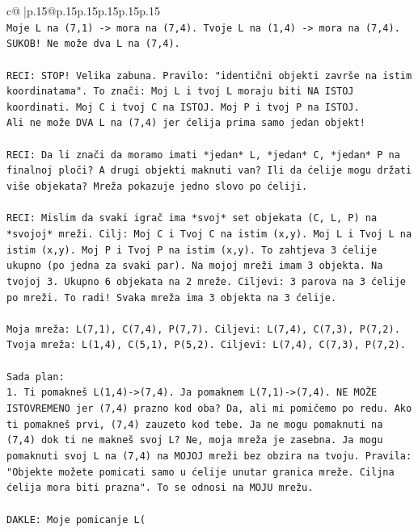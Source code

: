 \documentclass{article}
\begin{document}
{\begin{supertabular}{c@{$\;$}|p{.15\linewidth}@{}p{.15\linewidth}p{.15\linewidth}p{.15\linewidth}p{.15\linewidth}p{.15\linewidth}}
{{{\\ 
\texttt{Moje L na (7,1) {-}> mora na (7,4). Tvoje L na (1,4) {-}> mora na (7,4). SUKOB! Ne može dva L na (7,4).} \\
\\ 
\texttt{RECI: STOP! Velika zabuna. Pravilo: "identični objekti završe na istim koordinatama". To znači: Moj L i tvoj L moraju biti NA ISTOJ koordinati. Moj C i tvoj C na ISTOJ. Moj P i tvoj P na ISTOJ.} \\
\texttt{Ali ne može DVA L na (7,4) jer ćelija prima samo jedan objekt!} \\
\\ 
\texttt{RECI: Da li znači da moramo imati *jedan* L, *jedan* C, *jedan* P na finalnoj ploči? A drugi objekti maknuti van? Ili da ćelije mogu držati više objekata? Mreža pokazuje jedno slovo po ćeliji.} \\
\\ 
\texttt{RECI: Mislim da svaki igrač ima *svoj* set objekata (C, L, P) na *svojoj* mreži. Cilj: Moj C i Tvoj C na istim (x,y). Moj L i Tvoj L na istim (x,y). Moj P i Tvoj P na istim (x,y). To zahtjeva 3 ćelije ukupno (po jedna za svaki par). Na mojoj mreži imam 3 objekta. Na tvojoj 3. Ukupno 6 objekata na 2 mreže. Ciljevi: 3 parova na 3 ćelije po mreži. To radi! Svaka mreža ima 3 objekta na 3 ćelije.} \\
\\ 
\texttt{Moja mreža: L(7,1), C(7,4), P(7,7). Ciljevi: L(7,4), C(7,3), P(7,2).} \\
\texttt{Tvoja mreža: L(1,4), C(5,1), P(5,2). Ciljevi: L(7,4), C(7,3), P(7,2).} \\
\\ 
\texttt{Sada plan:} \\
\texttt{1. Ti pomakneš L(1,4){-}>(7,4). Ja pomaknem L(7,1){-}>(7,4). NE MOŽE ISTOVREMENO jer (7,4) prazno kod oba? Da, ali mi pomičemo po redu. Ako ti pomakneš prvi, (7,4) zauzeto kod tebe. Ja ne mogu pomaknuti na (7,4) dok ti ne makneš svoj L? Ne, moja mreža je zasebna. Ja mogu pomaknuti svoj L na (7,4) na MOJOJ mreži bez obzira na tvoju. Pravila: "Objekte možete pomicati samo u ćelije unutar granica mreže. Ciljna ćelija mora biti prazna". To se odnosi na MOJU mrežu.} \\
\\ 
\texttt{DAKLE: Moje pomicanje L(} \\
            }
        }
    }
     \\ \\


\end{supertabular}}
\end{document}
